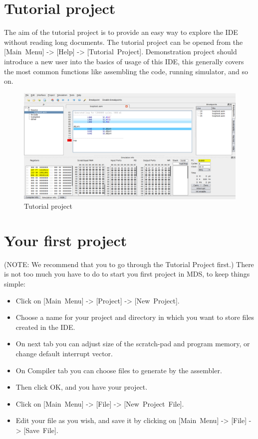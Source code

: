 \section{Tutorial project}
    The aim of the tutorial project is to provide an easy way to explore the IDE without reading long documents.
    The tutorial project can be opened from the [Main~Menu] -> [Help] -> [Tutorial~Project]. Demonstration project
    should introduce a new user into the basics of usage of this IDE, this generally covers the most common functions
    like assembling the code, running simulator, and so on.
    \begin{figure}[h]
        \centering
        \includegraphics[width=\textwidth]{img/demonstration_1.png}
        \caption{Tutorial project}
    \end{figure}

\section{Your first project}
    (NOTE: We recommend that you to go through the Tutorial Project first.) There is not too much you have to do to start you first project in MDS, to keep things simple:
    \begin{itemize}
        \item Click on [Main~Menu] -> [Project] -> [New~Project].
        \item Choose a name for your project and directory in which you want to store files created in the IDE.
        \item On next tab you can adjust size of the scratch-pad and program memory, or change default interrupt vector.
        \item On Compiler tab you can choose files to generate by the assembler.
        \item Then click OK, and you have your project.
        \item Click on [Main~Menu] -> [File] -> [New~Project~File].
        \item Edit your file as you wish, and save it by clicking on [Main~Menu] -> [File] -> [Save~File].
    \end{itemize}

